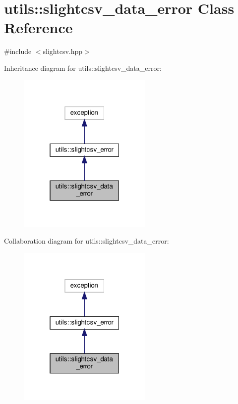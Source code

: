 \hypertarget{classutils_1_1slightcsv__data__error}{}\section{utils\+:\+:slightcsv\+\_\+data\+\_\+error Class Reference}
\label{classutils_1_1slightcsv__data__error}


{\ttfamily \#include $<$slightcsv.\+hpp$>$}



Inheritance diagram for utils\+:\+:slightcsv\+\_\+data\+\_\+error\+:
\nopagebreak
\begin{figure}[H]
\begin{center}
\leavevmode
\includegraphics[width=184pt]{classutils_1_1slightcsv__data__error__inherit__graph}
\end{center}
\end{figure}


Collaboration diagram for utils\+:\+:slightcsv\+\_\+data\+\_\+error\+:
\nopagebreak
\begin{figure}[H]
\begin{center}
\leavevmode
\includegraphics[width=184pt]{classutils_1_1slightcsv__data__error__coll__graph}
\end{center}
\end{figure}


